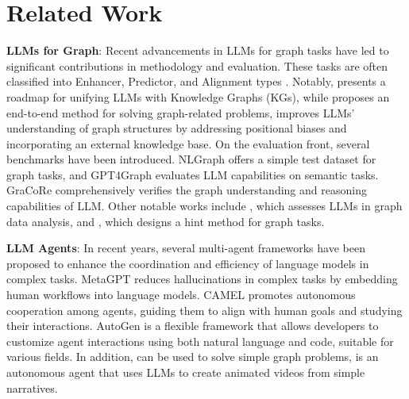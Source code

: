 \section{Related Work}
\textbf{LLMs for Graph}: Recent advancements in LLMs for graph tasks have led to significant contributions in methodology and evaluation. These tasks are often classified into Enhancer, Predictor, and Alignment types \citep{suvery}. Notably, \citep{2} presents a roadmap for unifying LLMs with Knowledge Graphs (KGs), while \citep{3} proposes an end-to-end method for solving graph-related problems,\cite{cao2024graphinsight} improves LLMs' understanding of graph structures by addressing positional biases and incorporating an external knowledge base. On the evaluation front, several benchmarks have been introduced. NLGraph \citep{NLgraph-6} offers a simple test dataset for graph tasks, and GPT4Graph \citep{gpt4graph-7} evaluates LLM capabilities on semantic tasks. GraCoRe\cite{yuan2025gracore} comprehensively verifies the graph understanding and reasoning capabilities of LLM. Other notable works include \citep{8}, which assesses LLMs in graph data analysis, and \citep{10}, which designs a hint method for graph tasks.

\noindent\textbf{LLM Agents}: In recent years, several multi-agent frameworks have been proposed to enhance the coordination and efficiency of language models in complex tasks. MetaGPT\cite{hong2023metagpt} reduces hallucinations in complex tasks by embedding human workflows into language models. CAMEL\cite{li2023camel} promotes autonomous cooperation among agents, guiding them to align with human goals and studying their interactions. AutoGen\cite{wu2023autogen} is a flexible framework that allows developers to customize agent interactions using both natural language and code, suitable for various fields. In addition, \cite{li2024graphteam} can be used to solve simple graph problems, \cite{li2024anim} is an autonomous agent that uses LLMs to create animated videos from simple narratives.
